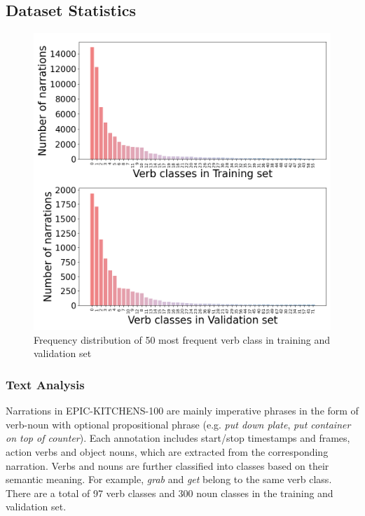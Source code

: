 \subsection{Dataset Statistics}

\begin{figure}[t]
    \centering
    \includegraphics[scale=0.25]{figures/verb_count.png}
    \caption{Frequency distribution of 50 most frequent verb class in training and validation set}
    \label{fig:verb_freq}
\end{figure}

\subsubsection{Text Analysis}
Narrations in EPIC-KITCHENS-100 are mainly imperative phrases in the form of verb-noun with optional propositional phrase (e.g. \textit{put down plate}, \textit{put container on top of counter}). Each annotation includes start/stop timestamps and frames, action verbs and object nouns, which are extracted from the corresponding narration. Verbs and nouns are further classified into classes based on their semantic meaning. For example, \textit{grab} and \textit{get} belong to the same verb class.  There are a total of 97 verb classes and 300 noun classes in the training and validation set.

